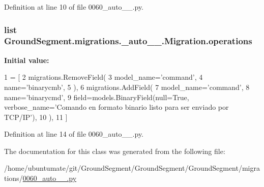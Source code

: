 Definition at line 10 of file 0060\+\_\+auto\+\_\+\_.\+py.

\hypertarget{class_ground_segment_1_1migrations_1_10060__auto__20170401__1620_1_1_migration_a0fcb5f095ebecd9382372295d5680592}{}
\subsubsection[{operations}]{\setlength{\rightskip}{0pt plus 5cm}list Ground\+Segment.\+migrations.\+\_\+auto\+\_\+\_.\+Migration.\+operations\hspace{0.3cm}{\ttfamily [static]}}\label{class_ground_segment_1_1migrations_1_10060__auto__20170401__1620_1_1_migration_a0fcb5f095ebecd9382372295d5680592}
{\bfseries Initial value\+:}
\begin{DoxyCode}
1 = [
2         migrations.RemoveField(
3             model\_name=\textcolor{stringliteral}{'command'},
4             name=\textcolor{stringliteral}{'binarycmb'},
5         ),
6         migrations.AddField(
7             model\_name=\textcolor{stringliteral}{'command'},
8             name=\textcolor{stringliteral}{'binarycmd'},
9             field=models.BinaryField(null=\textcolor{keyword}{True}, verbose\_name=\textcolor{stringliteral}{'Comando en formato binario listo para ser
       enviado por TCP/IP'}),
10         ),
11     ]
\end{DoxyCode}


Definition at line 14 of file 0060\+\_\+auto\+\_\+\_.\+py.



The documentation for this class was generated from the following file\+:\begin{DoxyCompactItemize}
\item 
/home/ubuntumate/git/\+Ground\+Segment/\+Ground\+Segment/\+Ground\+Segment/migrations/\hyperlink{0060__auto__20170401__1620_8py}{0060\+\_\+auto\+\_\+\_.\+py}\end{DoxyCompactItemize}

